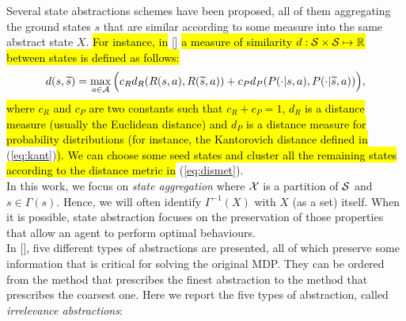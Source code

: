 \newline
Several state abstractions schemes have been proposed, all of them aggregating the ground states $s$ that are similar according to some measure into the same abstract state $X$. \hl{For instance, in} [\cite{ferns2012metrics}] \hl{a measure of similarity $d: \mathcal{S} \times \mathcal{S} \mapsto \mathbb{R}$ between states is defined as follows:}
\begin{align}
d(s, \widetilde{s}) = \max_{a \in \mathcal{A}} \Big( c_{R} d_{R}(R(s,a), R(\widetilde{s}, a)) + c_{P} d_{P}(P(\cdot|s, a), P(\cdot|\widetilde{s}, a)) \Big), \label{eq:dismet}
\end{align}
\hl{where $c_{R}$ and $c_{P}$ are two constants such that $c_{R} + c_{P} = 1$, $d_{R}$ is a distance measure (usually the Euclidean distance) and $d_{P}$ is a distance measure for probability distributions (for instance, the Kantorovich distance defined in} (\ref{eq:kant})\hl{). We can choose some seed states and cluster all the remaining states according to the distance metric in} (\ref{eq:dismet}).\\
\newline 
In this work, we focus on \textit{state aggregation} where $\mathcal{X}$ is a partition of $\mathcal{S}$ and $s\in\Gamma(s)$. Hence, we will often identify $\Gamma^{-1}(X)$ with $X$ (as a set) itself. When it is possible, state abstraction focuses on the preservation of those properties that allow an agent to perform optimal behaviours.\\
\newline
In [\cite{lihong2006towards}], five different types of abstractions are presented, all of which preserve some information that is critical for solving the original \ac{MDP}. They can be ordered from the method that prescribes the finest abstraction to the method that prescribes the coarsest one. Here we report the five types of abstraction, called \emph{irrelevance abstractions}:
